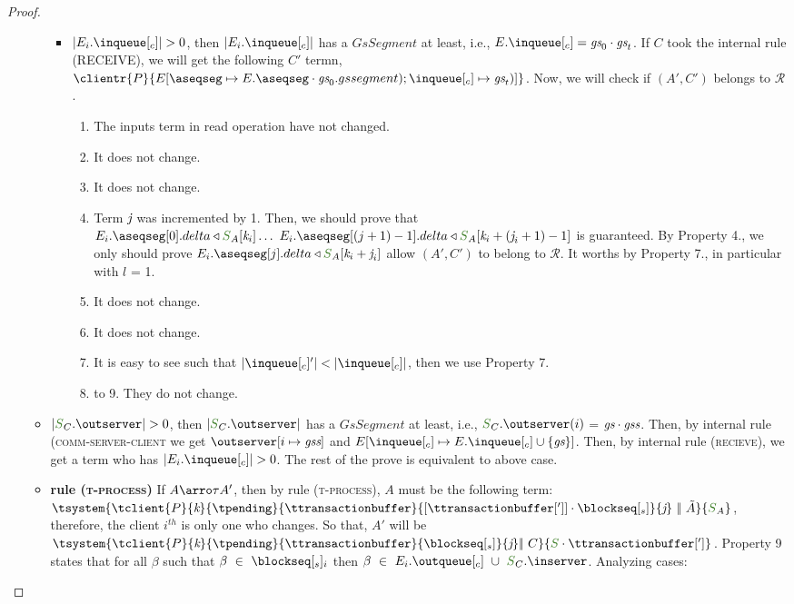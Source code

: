 \begin{proof}
\begin{itemize}
\begin{itemize}
						\begin{itemize}
							\item $|E_{i}.\inclient| > 0$, then $|E_{i}.\inclient|$ has a $GsSegment$ at least, i.e., $E.\inclient = \gs_0 \cdot \gs_t$. If $C$ took the internal rule (\textsc{\footnotesize{RECEIVE}}), we will get the following $C'$ termn, $\clientr{P}{\updatetwo{E}{\receivebuffer}{E.\receivebuffer \cdot \gs_0.gssegment)}{\inclient}{\gs_t)}}$. Now, we will check if $(A',C')$ belongs to $\mathcal{R}$.
							
							\begin{enumerate}
								\item The inputs term in read operation have not changed.
								\item It does not change.
								\item It does not change.
								\item Term $\textit{j}$ was incremented by 1. Then, we should prove that $E_{i}.\receivebuffer[0].delta \triangleleft \queuemessage_A[\tknown_i] \ldots\ E_{i}.\receivebuffer[(j+1) - 1].delta \triangleleft \queuemessage_A[\tknown_i + (\treceivebuffer_i+1) - 1]$ is guaranteed. By Property 4., we only should prove $E_{i}.\receivebuffer[j].delta \triangleleft \queuemessage_A[\tknown_i + \treceivebuffer_i]$ allow $(A',C')$ to belong to $\mathcal{R}$. It worths by Property 7., in particular with $l$ = 1.  
								\item It does not change.
								\item It does not change.
							  \item It is easy to see such that $|\inclient'| < |\inclient|$, then we use Property 7.
								\item to 9. They do not change.
							\end{enumerate}
						\end{itemize}
					\item $|\queuemessage_C.\outserver| > 0$, then $|\queuemessage_C.\outserver|$ has a $GsSegment$ at least, i.e., $\queuemessage_C.\outserver(i)$ = $\textit{gs} \cdot \textit{gss}$. Then, by internal rule (\textsc{\footnotesize{comm-server-client}} we get $\update{\outserver}{i}{\gss}$ and $\update{E}{\inclient}{E.\inclient \cup \{\gs\}}$. Then, by internal rule (\textsc{\footnotesize{recieve}}), we get a term who has $|E_{i}.\inclient| > 0$. The rest of the prove is equivalent to above case.
						
\item {\bf rule (\textsc{t-process})} If $A \arroi{\tau} A'$, then by rule (\textsc{\footnotesize{t-process}}), $A$ must be the following term: $\tsystem{\tclient{\tprogram}{\tknown}{\tpending}{\ttransactionbuffer}{[\tsenthead] \cdot \tsent}{\treceivebuffer}\ \bigpar\ \tilde{A}}{\queuemessage_A}$, therefore, the client $i^{th}$ is only one who changes. So that, $A'$ will be $\tsystem{\tclient{\tprogram}{\tknown}{\tpending}{\ttransactionbuffer}{\tsent}{\treceivebuffer}\bigpar\ C}{\queuemessage \cdot \tsenthead}$. Property 9 states that for all $\beta$ such that $\beta \ \in \ \tsent_i$ then $\beta \ \in \ E_{i}.\outclient \ \cup \ \queuemessage_C.\inserver$. Analyzing cases:
					

\end{itemize}
\end{itemize}
\end{proof}

